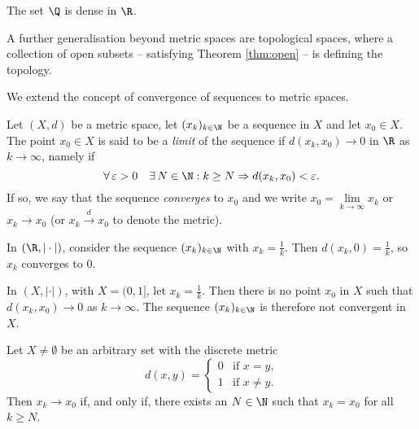 \begin{example}
The set $\Q$ is dense in $\R$.
\end{example}

\bis

\begin{remark} A further generalisation beyond metric spaces are topological spaces, where a collection of open subsets -- satisfying Theorem 
\ref{thm:open} -- is defining the topology.  
\end{remark}


%
%







We extend the concept of convergence of sequences to metric spaces.

\begin{definition}
Let $(X,d)$ be a metric space, let $(x_k)_{k \in \N}$ be a sequence in $X$ and let $x_0\in X$. The point
$x_0 \in X$ is said to be a \emph{limit} of the sequence if $d(x_k,x_0) \to 0$
in $\R$ as $k \to \infty$, namely if  
$$
\forall \, \varepsilon>0 \quad \exists \,N\in \N: k\geq N \Rightarrow d(x_k,x_0)<\varepsilon.
$$
If so, we say that the sequence \emph{converges} to
$x_0$ and we write $x_0 = \lim\limits_{k \to \infty} x_k$ or $x_k \to x_0$ (or $x_k \stackrel{d}{\to} x_0$ to denote the metric).
\end{definition}

\np

\begin{example}
In $(\R, |\cdot|)$, consider the sequence $(x_k)_{k \in \N}$
with $x_k = \frac{1}{k}$. Then $d(x_k,0) = \frac{1}{k}$, so $x_k$
converges to $0$.
\end{example}

\begin{example}
In $(X,|\cdot|)$, with $X = (0,1]$, let $x_k = \frac{1}{k}$. Then there is no point $x_0$ in $X$ such that
$d(x_k,x_0) \to 0$ as $k \to \infty$. The sequence $(x_k)_{k \in \N}$
is therefore not convergent in $X$.
\end{example}

\begin{example}
Let $X \not= \emptyset$ be an arbitrary set with the discrete metric
\[
d(x,y) = \begin{cases} 0 & \text{if $x = y$,} \\ 1 & \text{if $x \not= y$.} \end{cases}
\]
Then $x_k \to x_0$ if, and only if, there exists an $N \in \N$ such that $x_k = x_0$ for all
$k \ge N$.
\end{example}

